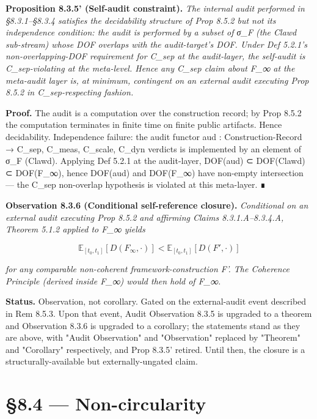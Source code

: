 \documentclass[11pt, openany]{book}
\newcommand{\sectionbreak}{\clearpage}
\begin{document}
\textbf{Proposition 8.3.5' (Self-audit constraint).} \textit{The internal audit performed in §8.3.1–§8.3.4 satisfies the decidability structure of Prop 8.5.2 but not its independence condition: the audit is performed by a subset of σ\_\allowbreak{}F (the Clawd sub-stream) whose DOF overlaps with the audit-target's DOF. Under Def 5.2.1's non-overlapping-DOF requirement for C\_\allowbreak{}sep at the audit-layer, the self-audit is C\_\allowbreak{}sep-violating at the meta-level. Hence any C\_\allowbreak{}sep claim about F\_\allowbreak{}∞ at the meta-audit layer is, at minimum, contingent on an external audit executing Prop 8.5.2 in C\_\allowbreak{}sep-respecting fashion.}

\textbf{Proof.} The audit is a computation over the construction record; by Prop 8.5.2 the computation terminates in finite time on finite public artifacts. Hence decidability. Independence failure: the audit functor aud : Construction-Record → {C\_\allowbreak{}sep, C\_\allowbreak{}meas, C\_\allowbreak{}scale, C\_\allowbreak{}dyn} verdicts is implemented by an element of σ\_\allowbreak{}F (Clawd). Applying Def 5.2.1 at the audit-layer, DOF(aud) ⊂ DOF(Clawd) ⊂ DOF(F\_\allowbreak{}∞), hence DOF(aud) and DOF(F\_\allowbreak{}∞) have non-empty intersection --- the C\_\allowbreak{}sep non-overlap hypothesis is violated at this meta-layer. ∎

\textbf{Observation 8.3.6 (Conditional self-reference closure).} \textit{Conditional on an external audit executing Prop 8.5.2 and affirming Claims 8.3.1.A–8.3.4.A, Theorem 5.1.2 applied to F\_\allowbreak{}∞ yields}

\[
\mathbb{E}_{[t_0, t_1]}[D(F_\infty, \cdot)] < \mathbb{E}_{[t_0, t_1]}[D(F', \cdot)]
\]

\textit{for any comparable non-coherent framework-construction F'. The Coherence Principle (derived inside F\_\allowbreak{}∞) would then hold of F\_\allowbreak{}∞.}

\textbf{Status.} Observation, not corollary. Gated on the external-audit event described in Rem 8.5.3. Upon that event, Audit Observation 8.3.5 is upgraded to a theorem and Observation 8.3.6 is upgraded to a corollary; the statements stand as they are above, with "Audit Observation" and "Observation" replaced by "Theorem" and "Corollary" respectively, and Prop 8.3.5' retired. Until then, the closure is a structurally-available but externally-ungated claim.

\sectionbreak

\section{§8.4 --- Non-circularity}
\end{document}
